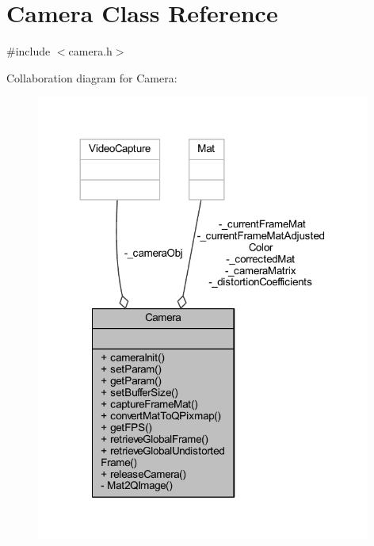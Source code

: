 \hypertarget{class_camera}{}\section{Camera Class Reference}
\label{class_camera}


{\ttfamily \#include $<$camera.\+h$>$}



Collaboration diagram for Camera\+:
\nopagebreak
\begin{figure}[H]
\begin{center}
\leavevmode
\includegraphics[width=312pt]{class_camera__coll__graph}
\end{center}
\end{figure}
